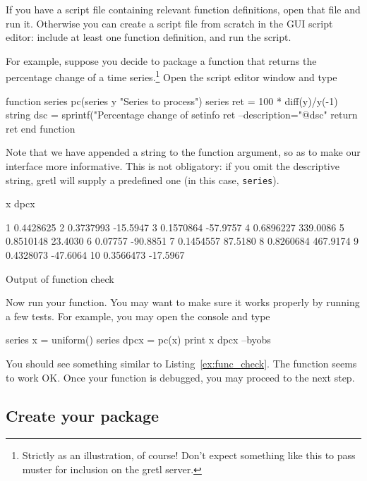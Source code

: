 \documentclass[oneside]{book}
\begin{document}
If you have a script file containing relevant function definitions,
open that file and run it. Otherwise you can create a script file from
scratch in the GUI script editor: include at least one function
definition, and run the script.

For example, suppose you decide to package a function that returns the
percentage change of a time series.\footnote{Strictly as an
  illustration, of course! Don't expect something like this to pass
  muster for inclusion on the gretl server.} Open the script editor
window and type
%
\begin{code}
function series pc(series y "Series to process")
    series ret = 100 * diff(y)/y(-1)
    string dsc = sprintf("Percentage change of %
    setinfo ret --description="@dsc"
    return ret
end function
\end{code}

Note that we have appended a string to the function argument, so as to
make our interface more informative.  This is not obligatory: if you
omit the descriptive string, gretl will supply a predefined one (in
this case, \texttt{series}).

\begin{script}[htbp]
  \centering
  \begin{scode}
              x         dpcx

 1    0.4428625
 2    0.3737993     -15.5947
 3    0.1570864     -57.9757
 4    0.6896227     339.0086
 5    0.8510148      23.4030
 6      0.07757     -90.8851
 7    0.1454557      87.5180
 8    0.8260684     467.9174
 9    0.4328073     -47.6064
10    0.3566473     -17.5967

  \end{scode}
  \caption{Output of function check}
  \label{ex:func_check}
\end{script}

Now run your function. You may want to make sure it works properly by
running a few tests. For example, you may open the console and type

\begin{code}
series x = uniform()
series dpcx = pc(x)
print x dpcx --byobs
\end{code}

You should see something similar to Listing~\ref{ex:func_check}. The
function seems to work OK.  Once your function is debugged, you may
proceed to the next step.

\subsection{Create your package}
\label{sec:gui-create}
\end{document}
